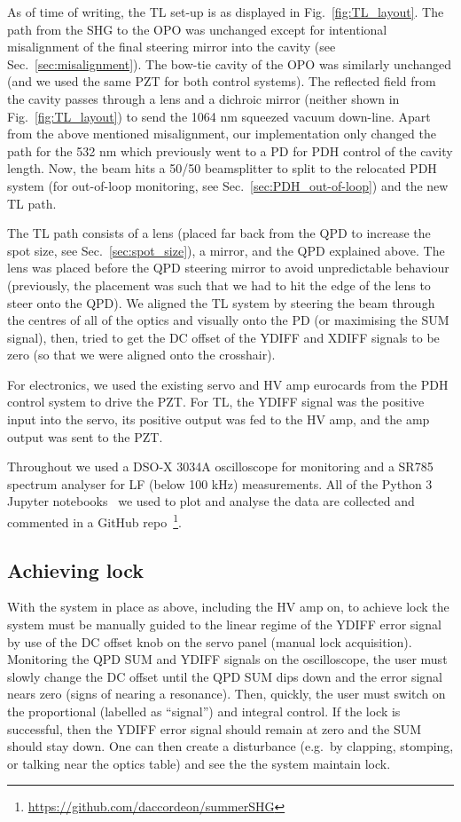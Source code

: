\documentclass[aps,pra,superscriptaddress,reprint,nofootinbib]{revtex4-1}
\begin{document}
As of time of writing, the TL set-up is as displayed in Fig.~\ref{fig:TL_layout}. The path from the SHG to the OPO was unchanged except for intentional misalignment of the final steering mirror into the cavity (see Sec.~\ref{sec:misalignment}). The bow-tie cavity of the OPO was similarly unchanged (and we used the same PZT for both control systems). The reflected field from the cavity passes through a lens and a dichroic mirror (neither shown in Fig.~\ref{fig:TL_layout}) to send the 1064 nm squeezed vacuum down-line. Apart from the above mentioned misalignment, our implementation only changed the path for the 532 nm which previously went to a PD for PDH control of the cavity length. Now, the beam hits a 50/50 beamsplitter to split to the relocated PDH system (for out-of-loop monitoring, see Sec.~\ref{sec:PDH_out-of-loop}) and the new TL path.

The TL path consists of a lens (placed far back from the QPD to increase the spot size, see Sec.~\ref{sec:spot_size}), a mirror, and the QPD explained above. The lens was placed before the QPD steering mirror to avoid unpredictable behaviour (previously, the placement was such that we had to hit the edge of the lens to steer onto the QPD). We aligned the TL system by steering the beam through the centres of all of the optics and visually onto the PD (or maximising the SUM signal), then, tried to get the DC offset of the YDIFF and XDIFF signals to be zero (so that we were aligned onto the crosshair).

For electronics, we used the existing servo and HV amp eurocards from the PDH control system to drive the PZT. For TL, the YDIFF signal was the positive input into the servo, its positive output was fed to the HV amp, and the amp output was sent to the PZT.

Throughout we used a DSO-X 3034A oscilloscope for monitoring and a SR785 spectrum analyser for LF (below 100 kHz) measurements. All of the Python 3 Jupyter notebooks~\cite{python,ipython,jupyter} we used to plot and analyse the data are collected and commented in a GitHub repo~\footnote{\url{https://github.com/daccordeon/summerSHG}}.


\subsection{Achieving lock}

With the system in place as above, including the HV amp on, to achieve lock the system must be manually guided to the linear regime of the YDIFF error signal by use of the DC offset knob on the servo panel (manual lock acquisition). Monitoring the QPD SUM and YDIFF signals on the oscilloscope, the user must slowly change the DC offset until the QPD SUM dips down and the error signal nears zero (signs of nearing a resonance). Then, quickly, the user must switch on the proportional (labelled as “signal”) and integral control. If the lock is successful, then the YDIFF error signal should remain at zero and the SUM should stay down. One can then create a disturbance (e.g.\ by clapping, stomping, or talking near the optics table) and see the the system maintain lock. 
\end{document}
